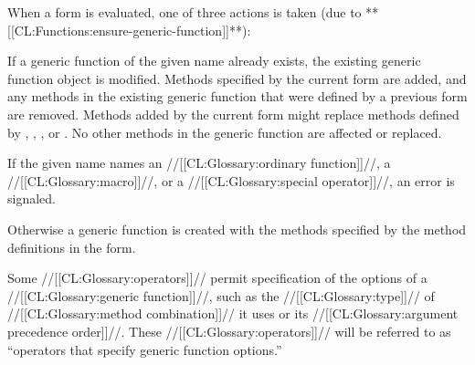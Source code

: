





































When a  form is evaluated, one of three actions
is taken (due to **[[CL:Functions:ensure-generic-function]]**):




\beginlist

\itemitem{\bull} If a generic function of the given name already exists,
the existing generic function object is modified.  Methods specified
by the current  form are added, and any methods in the
existing generic function that were defined by a previous 
form are removed.  Methods added by the current  
form might replace methods defined by , 
, , or .  
No other methods in the generic function are affected
or replaced.

\itemitem{\bull} If the given name names 
    an //[[CL:Glossary:ordinary function]]//, 
    a  //[[CL:Glossary:macro]]//,
 or a //[[CL:Glossary:special operator]]//, 
an error is signaled.

\itemitem{\bull} Otherwise a generic function is created with the
methods specified by the method definitions in the 
form.

\endlist

Some //[[CL:Glossary:operators]]// permit specification of the options of a
//[[CL:Glossary:generic function]]//, such as 
the //[[CL:Glossary:type]]// of //[[CL:Glossary:method combination]]// it uses 
or its //[[CL:Glossary:argument precedence order]]//.
These //[[CL:Glossary:operators]]// will be referred to as
``operators that specify generic function options.''



